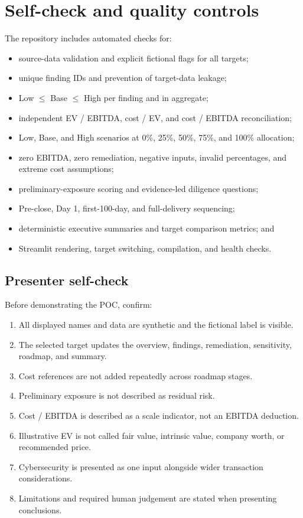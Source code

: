 \documentclass[11pt,a4paper]{article}
\begin{document}
\section{Self-check and quality controls}

The repository includes automated checks for:

\begin{itemize}
  \item source-data validation and explicit fictional flags for all targets;
  \item unique finding IDs and prevention of target-data leakage;
  \item Low $\leq$ Base $\leq$ High per finding and in aggregate;
  \item independent EV / EBITDA, cost / EV, and cost / EBITDA reconciliation;
  \item Low, Base, and High scenarios at 0\%, 25\%, 50\%, 75\%, and 100\% allocation;
  \item zero EBITDA, zero remediation, negative inputs, invalid percentages, and extreme cost assumptions;
  \item preliminary-exposure scoring and evidence-led diligence questions;
  \item Pre-close, Day 1, first-100-day, and full-delivery sequencing;
  \item deterministic executive summaries and target comparison metrics; and
  \item Streamlit rendering, target switching, compilation, and health checks.
\end{itemize}

\subsection{Presenter self-check}

Before demonstrating the POC, confirm:

\begin{enumerate}
  \item All displayed names and data are synthetic and the fictional label is visible.
  \item The selected target updates the overview, findings, remediation, sensitivity, roadmap, and summary.
  \item Cost references are not added repeatedly across roadmap stages.
  \item Preliminary exposure is not described as residual risk.
  \item Cost / EBITDA is described as a scale indicator, not an EBITDA deduction.
  \item Illustrative EV is not called fair value, intrinsic value, company worth, or recommended price.
  \item Cybersecurity is presented as one input alongside wider transaction considerations.
  \item Limitations and required human judgement are stated when presenting conclusions.
\end{enumerate}
\end{document}
